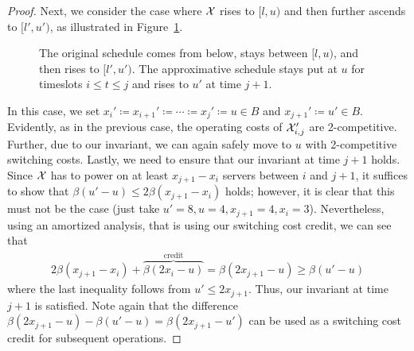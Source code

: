 \begin{proof}
Next, we consider the case where $\mathcal{X}$ rises to $[l,u)$ and then further ascends to $[l',u')$, as illustrated in Figure~\ref{fig:schedule_behavior_up_up}.
\begin{figure}[H]
\centering
	
\caption{The original schedule comes from below, stays between $[l,u)$, and then rises to $[l',u')$. The approximative schedule stays put at $u$ for timeslots $i\le t\le j$ and rises to $u'$ at time $j+1$.}
\label{fig:schedule_behavior_up_up}
\end{figure}
In this case, we set $x_i'\coloneqq x_{i+1}'\coloneqq\dotsb\coloneqq x_j'\coloneqq u\in B$ and $x_{j+1}'\coloneqq u'\in B$. Evidently, as in the previous case, the operating costs of $\mathcal{X}_{i,j}'$ are 2-competitive. Further, due to our invariant, we can again safely move to $u$ with 2-competitive switching costs. Lastly, we need to ensure that our invariant at time $j+1$ holds. Since $\mathcal{X}$ has to power on at least $x_{j+1}-x_i$ servers between $i$ and $j+1$, it suffices to show that $\beta(u'-u)\le2\beta(x_{j+1}-x_i)$ holds; however, it is clear that this must not be the case (just take $u'=8,u=4,x_{j+1}=4,x_i=3$). Nevertheless, using an amortized analysis, that is using our switching cost credit, we can see that
\begin{align*}
	2\beta(x_{j+1}-x_i)+\overbrace{\beta(2x_i-u)}^{\text{credit}}=\beta(2x_{j+1}-u)\ge\beta(u'-u)
\end{align*}
where the last inequality follows from $u'\le2x_{j+1}$. Thus, our invariant at time $j+1$ is satisfied. Note again that the difference $\beta(2x_{j+1}-u)-\beta(u'-u)=\beta(2x_{j+1}-u')$ can be used as a switching cost credit for subsequent operations. 
	

\end{proof}
